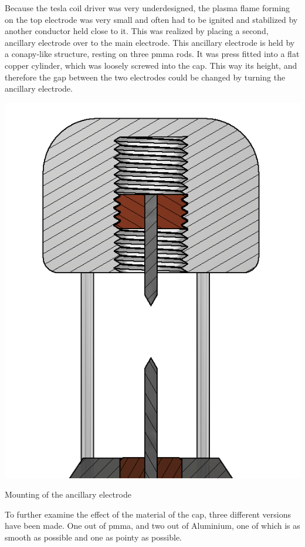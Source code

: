 Because the tesla coil driver was very underdesigned, the plasma flame forming on the top electrode was very small and often had to be ignited and stabilized by another conductor held close to it. This was realized by placing a second, ancillary electrode over to the main electrode. This ancillary electrode is held by a conapy-like structure, resting on three \gls{pmma} rods. It was press fitted into a flat copper cylinder, which was loosely screwed into the cap. This way its height, and therefore the gap between the two electrodes could be changed by turning the ancillary electrode. 

\begin{marginfigure}[-3cm]
    \centering
    \includegraphics[width=\textwidth]{kassandra/resources/mirGehtsSuperDanke.png}
    \caption{Mounting of the ancillary electrode}
    \label{fig:ancillary-electrode}
\end{marginfigure}

To further examine the effect of the material of the cap, three different versions have been made. One out of \gls{pmma}, and two out of Aluminium, one of which is as smooth as possible and one as pointy as possible.


